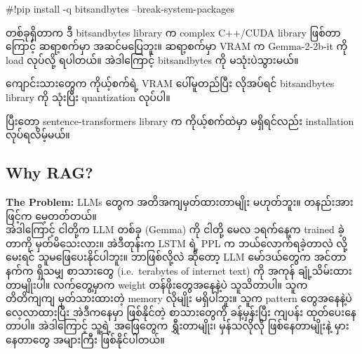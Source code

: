 \documentclass[11pt]{article}
\begin{document}
\#!pip install -q bitsandbytes --break-system-packages

{\burmesefont တစ်ခုရှိတာက} {\burmesefont ဒီ} bitsandbytes library {\burmesefont က} complex C++/CUDA library {\burmesefont ဖြစ်တာကြောင့်}
{\burmesefont ဆရာ့စက်မှာ} {\burmesefont အဆင်မပြေဘူး။} {\burmesefont ဆရာ့စက်မှာ} VRAM {\burmesefont က} Gemma-2-2b-it {\burmesefont ကို} load {\burmesefont လုပ်လို့} {\burmesefont ရပါတယ်။}
{\burmesefont အဲဒါကြောင့်} bitsandbytes {\burmesefont ကို} {\burmesefont မသုံးပဲသွားမယ်။}

{\burmesefont ကျောင်းသားတွေက} {\burmesefont ကိုယ့်စက်ရဲ့} VRAM {\burmesefont ပေါ်မူတည်ပြီး} {\burmesefont လိုအပ်ရင်} bitsandbytes library {\burmesefont ကို} {\burmesefont သုံးပြီး}
quantization {\burmesefont လုပ်ပါ။}

{\burmesefont ပြီးတော့} sentence-transformers library {\burmesefont က} {\burmesefont ကိုယ့်စက်ထဲမှာ} {\burmesefont မရှိရင်လည်း} installation
{\burmesefont လုပ်ရလိမ့်မယ်။}

    \hypertarget{why-rag}{%
\subsection{Why RAG?}\label{why-rag}}

\textbf{The Problem:} LLMs {\burmesefont တွေက} {\burmesefont အတိအကျမှတ်ထားတာမျိုး} {\burmesefont မဟုတ်ဘူး။} {\burmesefont တနည်းအားဖြင့်က}
{\burmesefont မေ့တတ်တယ်။}\\
{\burmesefont အဲဒါကြောင့်} {\burmesefont ငါတို့က} LLM {\burmesefont တစ်ခု} (Gemma) {\burmesefont ကို} {\burmesefont ငါတို့} {\burmesefont မေလ} {\burmesefont ၁ရက်နေ့က} trained {\burmesefont ခဲ့တာကို} {\burmesefont မှတ်မိသေးလား။}
{\burmesefont အဲဒီတုန်းက} LSTM {\burmesefont ရဲ့} PPL {\burmesefont က} {\burmesefont ဘယ်လောက်ရခဲ့တာလဲ} {\burmesefont လို့} {\burmesefont မေးရင်} {\burmesefont သူမဖြေပေးနိုင်ပါဘူး။} {\burmesefont ဘာဖြစ်လို့လဲ} {\burmesefont ဆိုတော့} LLM
{\burmesefont မော်ဒယ်တွေက} {\burmesefont အင်တာနက်က} {\burmesefont ရှိသမျှ} {\burmesefont စာသားတွေ} (i.e.~terabytes of internet text) {\burmesefont ကို} {\burmesefont အကုန်}
{\burmesefont ချုံ့သိမ်းထားတာမျိုးပါ။} {\burmesefont လက်တွေ့မှာက} weight {\burmesefont တန်ဖိုးတွေအနေနဲ့ပဲ} {\burmesefont သူသိတာပါ။} {\burmesefont သူက} {\burmesefont တိတိကျကျ} {\burmesefont မှတ်သားထားတဲ့}
memory {\burmesefont လိုမျိုး} {\burmesefont မရှိပါဘူး။} {\burmesefont သူက} pattern {\burmesefont တွေအနေနဲ့ပဲ} {\burmesefont လေ့လာထားပြီး} {\burmesefont အဲဒီကနေမှာ} {\burmesefont ဖြစ်နိုင်တဲ့}
{\burmesefont စာသားတွေကို} {\burmesefont ခန့်မှန်းပြီး} {\burmesefont ကျပန်း} {\burmesefont ထုတ်ပေးနေတာပါ။} {\burmesefont အဲဒါကြောင့်} {\burmesefont သူ့ရဲ့} {\burmesefont အဖြေတွေက} {\burmesefont ရွှီးတာမျိုး၊} {\burmesefont မှန်သလိုလို}
{\burmesefont ဖြစ်နေတာမျိုးနဲ့} {\burmesefont မှားနေတာတွေ} {\burmesefont အများကြီး} {\burmesefont ဖြစ်နိုင်ပါတယ်။}
\end{document}
